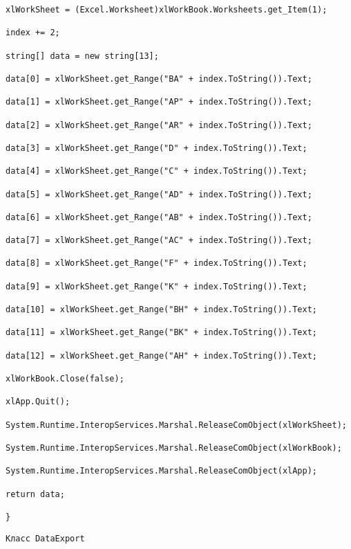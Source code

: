 \begin{lstlisting}
xlWorkSheet = (Excel.Worksheet)xlWorkBook.Worksheets.get_Item(1);

index += 2;

string[] data = new string[13];

data[0] = xlWorkSheet.get_Range("BA" + index.ToString()).Text;

data[1] = xlWorkSheet.get_Range("AP" + index.ToString()).Text;

data[2] = xlWorkSheet.get_Range("AR" + index.ToString()).Text;

data[3] = xlWorkSheet.get_Range("D" + index.ToString()).Text;

data[4] = xlWorkSheet.get_Range("C" + index.ToString()).Text;

data[5] = xlWorkSheet.get_Range("AD" + index.ToString()).Text;

data[6] = xlWorkSheet.get_Range("AB" + index.ToString()).Text;

data[7] = xlWorkSheet.get_Range("AC" + index.ToString()).Text;

data[8] = xlWorkSheet.get_Range("F" + index.ToString()).Text;

data[9] = xlWorkSheet.get_Range("K" + index.ToString()).Text;

data[10] = xlWorkSheet.get_Range("BH" + index.ToString()).Text;

data[11] = xlWorkSheet.get_Range("BK" + index.ToString()).Text;

data[12] = xlWorkSheet.get_Range("AH" + index.ToString()).Text;

xlWorkBook.Close(false);

xlApp.Quit();

System.Runtime.InteropServices.Marshal.ReleaseComObject(xlWorkSheet);

System.Runtime.InteropServices.Marshal.ReleaseComObject(xlWorkBook);

System.Runtime.InteropServices.Marshal.ReleaseComObject(xlApp);

return data;

} 
\end{lstlisting}

\begin{verbatim}
Класс DataExport
\end{verbatim}


